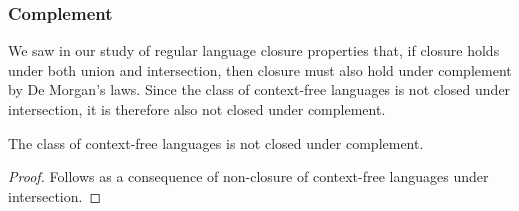 \subsubsection*{Complement}

We saw in our study of regular language closure properties that, if closure holds under both union and intersection, then closure must also hold under complement by De Morgan's laws. Since the class of context-free languages is not closed under intersection, it is therefore also not closed under complement.

\begin{theorem}\label{thm:CFLnonclosurecomplement}
The class of context-free languages is not closed under complement.

\begin{proof}
Follows as a consequence of non-closure of context-free languages under intersection.
\end{proof}
\end{theorem}